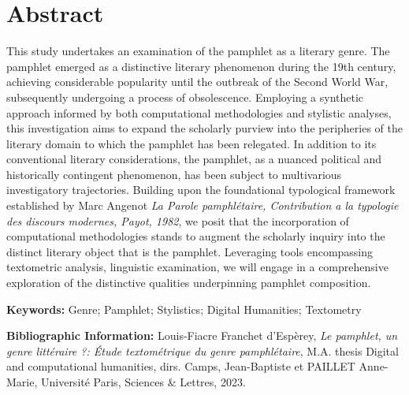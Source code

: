 \section*{Abstract}
This study undertakes an examination of the pamphlet as a literary genre. The pamphlet emerged as a distinctive literary phenomenon during the 19th century, achieving considerable popularity until the outbreak of the Second World War, subsequently undergoing a process of obsolescence. Employing a synthetic approach informed by both computational methodologies and stylistic analyses, this investigation aims to expand the scholarly purview into the peripheries of the literary domain to which the pamphlet has been relegated. In addition to its conventional literary considerations, the pamphlet, as a nuanced political and historically contingent phenomenon, has been subject to multivarious investigatory trajectories. Building upon the foundational typological framework established by Marc Angenot \textit{La Parole pamphlétaire, Contribution a la typologie des discours modernes, Payot, 1982}, we posit that the incorporation of computational methodologies stands to augment the scholarly inquiry into the distinct literary object that is the pamphlet. Leveraging tools encompassing textometric analysis, linguistic examination, we will engage in a comprehensive exploration of the distinctive qualities underpinning pamphlet composition.
\medskip

\textbf{Keywords:} Genre; Pamphlet; Stylistics; Digital Humanities; Textometry

\textbf{Bibliographic Information:} Louis-Fiacre Franchet d'Espèrey, \textit{Le pamphlet, un genre littéraire ?: Étude textométrique du genre pamphlétaire}, M.A. thesis \og Digital and computational humanities\fg{}, dirs. Camps, Jean-Baptiste et PAILLET Anne-Marie, Université Paris, Sciences \& Lettres, 2023.